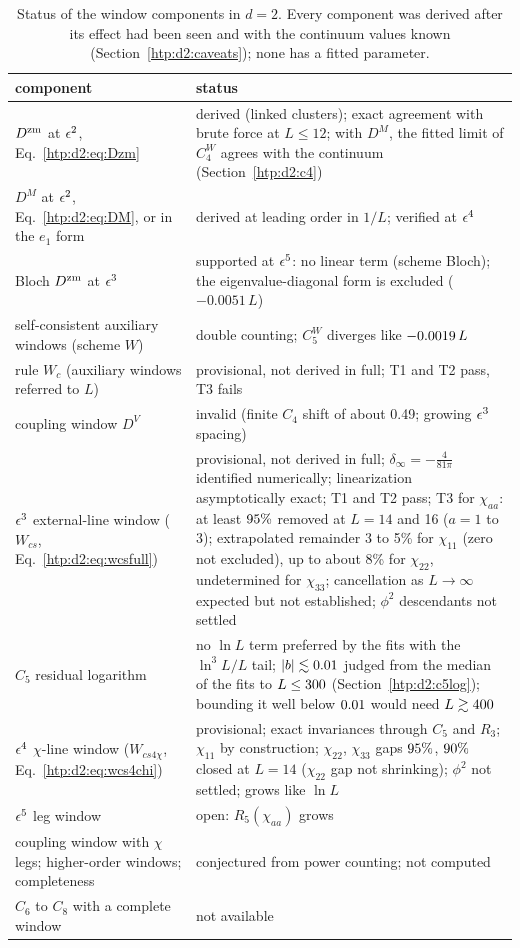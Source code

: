 \begin{table}[ht]
\centering\footnotesize\renewcommand{\arraystretch}{1.15}
\begin{tabular}{@{}p{6.4cm}p{8.6cm}@{}}
\toprule
component & status \\\midrule
$D^{\rm zm}$ at $\epsilon^2$, Eq.~\eqref{htp:d2:eq:Dzm} & derived (linked clusters); exact agreement with brute force at $L\le12$; with $D^M$, the fitted limit of $C_4^W$ agrees with the continuum (Section~\ref{htp:d2:c4}) \\
$D^M$ at $\epsilon^2$, Eq.~\eqref{htp:d2:eq:DM}, or in the $e_1$ form & derived at leading order in $1/L$; verified at $\epsilon^4$ \\
Bloch $D^{\rm zm}$ at $\epsilon^3$ & supported at $\epsilon^5$: no linear term (scheme Bloch); the eigenvalue-diagonal form is excluded ($-0.0051\,L$) \\
self-consistent auxiliary windows (scheme $W$) & double counting; $C_5^W$ diverges like $-0.0019\,L$ \\
rule $W_c$ (auxiliary windows referred to $L$) & provisional, not derived in full; T1 and T2 pass, T3 fails \\
coupling window $D^V$ & invalid (finite $C_4$ shift of about 0.49; growing $\epsilon^3$ spacing) \\
$\epsilon^3$ external-line window ($W_{cs}$, Eq.~\eqref{htp:d2:eq:wcsfull}) & provisional, not derived in full; $\delta_\infty=-\frac4{81\pi}$ identified numerically; linearization asymptotically exact; T1 and T2 pass; T3 for $\chi_{aa}$: at least $95\%$ removed at $L=14$ and 16 ($a=1$ to 3); extrapolated remainder 3 to 5\% for $\chi_{11}$ (zero not excluded), up to about 8\% for $\chi_{22}$, undetermined for $\chi_{33}$; cancellation as $L\to\infty$ expected but not established; $\phi^2$ descendants not settled \\
$C_5$ residual logarithm & no $\ln L$ term preferred by the fits with the $\ln^3L/L$ tail; $|b|\lesssim0.01$ judged from the median of the fits to $L\le300$ (Section~\ref{htp:d2:c5log}); bounding it well below $0.01$ would need $L\gtrsim400$ \\
$\epsilon^4$ $\chi$-line window ($W_{cs4\chi}$, Eq.~\eqref{htp:d2:eq:wcs4chi}) & provisional; exact invariances through $C_5$ and $R_3$; $\chi_{11}$ by construction; $\chi_{22}$, $\chi_{33}$ gaps $95\%$, $90\%$ closed at $L=14$ ($\chi_{22}$ gap not shrinking); $\phi^2$ not settled; grows like $\ln L$ \\
$\epsilon^5$ leg window & open: $R_5(\chi_{aa})$ grows \\
coupling window with $\chi$ legs; higher-order windows; completeness & conjectured from power counting; not computed \\
$C_6$ to $C_8$ with a complete window & not available \\
\bottomrule
\end{tabular}
\caption{Status of the window components in $d=2$. Every component was derived after its effect had been seen and with the
continuum values known (Section~\ref{htp:d2:caveats}); none has a fitted parameter.}
\label{htp:d2:tab:status}
\end{table}

